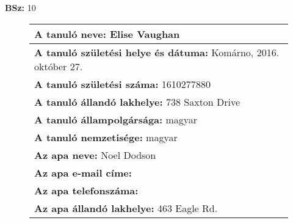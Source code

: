 \documentclass[10pt,a4paper]{article}
\begin{document}
    \vfill
    \textbf{BSz: }10
\newpage
    \begin{figure}[!ht]
    \begin{tabular}{|m{\textwidth}|}
    \hline \vspace{3pt}
    \textbf{A tanuló neve:} \hspace{0.5cm} Elise Vaughan \vspace{3pt} \\
\hline\vspace{3pt}
\textbf{A tanuló születési helye és dátuma:} \hspace{0.5cm} Komárno, 2016.  október 27. \vspace{3pt} \\
\hline\vspace{3pt}
\textbf{A tanuló születési száma:} \hspace{0.5cm} 1610277880 \vspace{3pt} \\
\hline\vspace{3pt}
\textbf{A tanuló állandó lakhelye:} \hspace{0.5cm} 738 Saxton Drive \vspace{3pt} \\
\hline\vspace{3pt}
\textbf{A tanuló állampolgársága:} \hspace{0.5cm} magyar \vspace{3pt} \\
\hline\vspace{3pt}
\textbf{A tanuló nemzetisége:} \hspace{0.5cm} magyar \vspace{3pt} \\
\hline\vspace{3pt}
\textbf{Az apa neve:} \hspace{0.5cm} Noel Dodson \vspace{3pt} \\
\hline\vspace{3pt}
\textbf{Az apa e-mail címe:} \hspace{0.5cm}  \vspace{3pt} \\
\hline\vspace{3pt}
\textbf{Az apa telefonszáma:} \hspace{0.5cm}  \vspace{3pt} \\
\hline\vspace{3pt}
\textbf{Az apa állandó lakhelye:} \hspace{0.5cm} 463 Eagle Rd. \vspace{3pt} \\

\end{tabular}
\end{figure}
\end{document}

